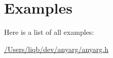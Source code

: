 \section{Examples}
Here is a list of all examples\+:\begin{DoxyCompactItemize}
\item 
\hyperlink{_2_users_2liqb_2dev_2anyarg_2anyarg_8h-example}{/\+Users/liqb/dev/anyarg/anyarg.\+h}
\end{DoxyCompactItemize}
